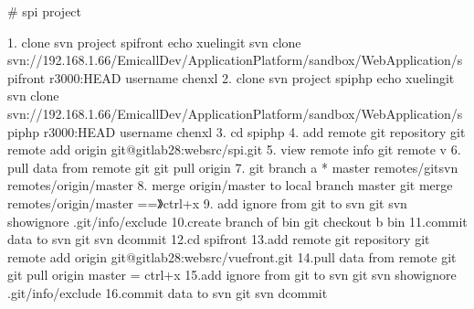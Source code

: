 \documentclass[a4paper,10pt,english]{sphinxmanual}
\begin{document}
\begin{sphinxVerbatim}[commandchars=\\\{\}]
      
          
  
    
       
   
   
    
    
            
   
     
\end{sphinxVerbatim}

\# spi project

\begin{sphinxVerbatim}[commandchars=\\\{\}]
1. clone svn project spi\PYGZhy{}front
        echo xuelin\textbar{}git svn clone svn://192.168.1.66/EmicallDev/ApplicationPlatform/sandbox/WebApplication/spi\PYGZhy{}front \PYGZhy{}r3000:HEAD \PYGZhy{}\PYGZhy{}username chenxl
2. clone svn project spi\PYGZhy{}php
        echo xuelin\textbar{}git svn clone svn://192.168.1.66/EmicallDev/ApplicationPlatform/sandbox/WebApplication/spi\PYGZhy{}php \PYGZhy{}r3000:HEAD \PYGZhy{}\PYGZhy{}username chenxl
3. cd spi\PYGZhy{}php
4. add remote git repository
   git remote add origin git@gitlab28:websrc/spi.git
5. view remote info
   git remote \PYGZhy{}v
6. pull data from remote git
        git pull origin
7. git branch \PYGZhy{}a
   * master
        remotes/git\PYGZhy{}svn
        remotes/origin/master
8. merge origin/master to local branch master
        git merge remotes/origin/master ==》ctrl+x
9. add ignore from git to svn
   git svn show\PYGZhy{}ignore \PYGZgt{}\PYGZgt{} .git/info/exclude
10.create branch of \PYGZdq{}bin\PYGZdq{}
   git checkout \PYGZhy{}b \PYGZdq{}bin\PYGZdq{}
11.commit data to svn
        git svn dcommit
12.cd spi\PYGZhy{}front
13.add remote git repository
        git remote add origin git@gitlab28:websrc/vuefront.git
14.pull data from remote git
        git pull origin master =\PYGZgt{} ctrl+x
15.add ignore from git to svn
        git svn show\PYGZhy{}ignore \PYGZgt{}\PYGZgt{} .git/info/exclude
16.commit data to svn
        git svn dcommit
\end{sphinxVerbatim}
\end{document}
